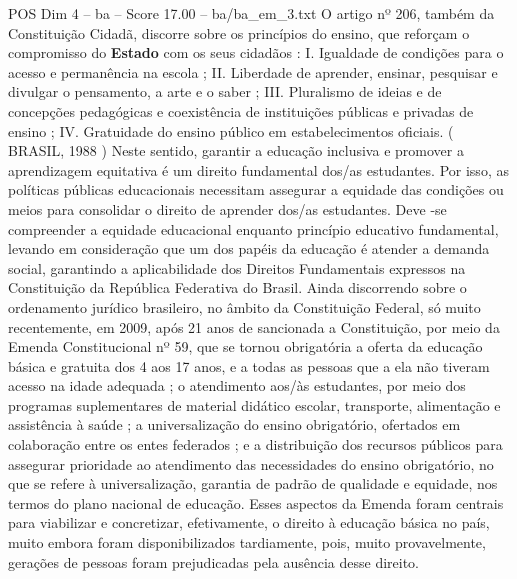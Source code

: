 \begin{textsample}{POS Dim 4 – ba – Score 17.00 – ba/ba\_em\_3.txt}
O artigo nº 206, também da Constituição Cidadã, discorre sobre os princípios do ensino, que reforçam o compromisso do \textbf{Estado} com os seus cidadãos : I.
Igualdade de condições para o acesso e permanência na escola ; II.
Liberdade de aprender, ensinar, pesquisar e divulgar o pensamento, a arte e o saber ; III.
Pluralismo de ideias e de concepções pedagógicas e coexistência de instituições públicas e privadas de ensino ; IV.
Gratuidade do ensino público em estabelecimentos oficiais. ( BRASIL, 1988 ) Neste sentido, garantir a educação inclusiva e promover a aprendizagem equitativa é um direito fundamental dos/as estudantes.
Por isso, as políticas públicas educacionais necessitam assegurar a equidade das condições ou meios para consolidar o direito de aprender dos/as estudantes.
Deve -se compreender a equidade educacional enquanto princípio educativo fundamental, levando em consideração que um dos papéis da educação é atender a demanda social, garantindo a aplicabilidade dos Direitos Fundamentais expressos na Constituição da República Federativa do Brasil.
Ainda discorrendo sobre o ordenamento jurídico brasileiro, no âmbito da Constituição Federal, só muito recentemente, em 2009, após 21 anos de sancionada a Constituição, por meio da Emenda Constitucional nº 59, que se tornou obrigatória a oferta da educação básica e gratuita dos 4 aos 17 anos, e a todas as pessoas que a ela não tiveram acesso na idade adequada ; o atendimento aos/às estudantes, por meio dos programas suplementares de material didático escolar, transporte, alimentação e assistência à saúde ; a universalização do ensino obrigatório, ofertados em colaboração entre os entes federados ; e a distribuição dos recursos públicos para assegurar prioridade ao atendimento das necessidades do ensino obrigatório, no que se refere à universalização, garantia de padrão de qualidade e equidade, nos termos do plano nacional de educação.
Esses aspectos da Emenda foram centrais para viabilizar e concretizar, efetivamente, o direito à educação básica no país, muito embora foram disponibilizados tardiamente, pois, muito provavelmente, gerações de pessoas foram prejudicadas pela ausência desse direito.

\end{textsample}
